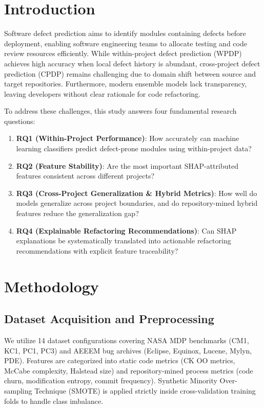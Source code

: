 \documentclass[10pt,journal,compsoc]{IEEEtran}
\begin{document}
\section{Introduction}
Software defect prediction aims to identify modules containing defects before deployment, enabling software engineering teams to allocate testing and code review resources efficiently. While within-project defect prediction (WPDP) achieves high accuracy when local defect history is abundant, cross-project defect prediction (CPDP) remains challenging due to domain shift between source and target repositories. Furthermore, modern ensemble models lack transparency, leaving developers without clear rationale for code refactoring.

To address these challenges, this study answers four fundamental research questions:
\begin{enumerate}
    \item \textbf{RQ1 (Within-Project Performance)}: How accurately can machine learning classifiers predict defect-prone modules using within-project data?
    \item \textbf{RQ2 (Feature Stability)}: Are the most important SHAP-attributed features consistent across different projects?
    \item \textbf{RQ3 (Cross-Project Generalization \& Hybrid Metrics)}: How well do models generalize across project boundaries, and do repository-mined hybrid features reduce the generalization gap?
    \item \textbf{RQ4 (Explainable Refactoring Recommendations)}: Can SHAP explanations be systematically translated into actionable refactoring recommendations with explicit feature traceability?
\end{enumerate}

\section{Methodology}
\subsection{Dataset Acquisition and Preprocessing}
We utilize 14 dataset configurations covering NASA MDP benchmarks (CM1, KC1, PC1, PC3) and AEEEM bug archives (Eclipse, Equinox, Lucene, Mylyn, PDE). Features are categorized into static code metrics (CK OO metrics, McCabe complexity, Halstead size) and repository-mined process metrics (code churn, modification entropy, commit frequency). Synthetic Minority Over-sampling Technique (SMOTE) is applied strictly inside cross-validation training folds to handle class imbalance.
\end{document}
